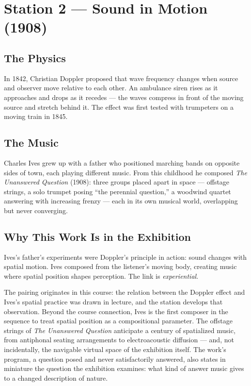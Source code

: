 \documentclass[11pt]{article}
\begin{document}
\section{Station 2 --- Sound in Motion (1908)}

\subsection{The Physics}
In 1842, Christian Doppler proposed that wave frequency changes when source and observer move
relative to each other. An ambulance siren rises as it approaches and drops as it recedes ---
the waves compress in front of the moving source and stretch behind it. The effect was first
tested with trumpeters on a moving train in 1845.

\subsection{The Music}
Charles Ives grew up with a father who positioned marching bands on opposite sides of town,
each playing different music. From this childhood he composed \emph{The Unanswered Question}
(1908): three groups placed apart in space --- offstage strings, a solo trumpet posing ``the
perennial question,'' a woodwind quartet answering with increasing frenzy --- each in its own
musical world, overlapping but never converging.

\subsection{Why This Work Is in the Exhibition}
Ives's father's experiments were Doppler's principle in action: sound changes with spatial
motion. Ives composed from the listener's moving body, creating music where spatial position
shapes perception. The link is \emph{experiential}.

The pairing originates in this course: the relation between the Doppler effect and Ives's
spatial practice was drawn in lecture, and the station develops that observation. Beyond the
course connection, Ives is the first composer in the sequence to treat spatial position as a
compositional parameter. The offstage strings of \emph{The Unanswered Question} anticipate a
century of spatialized music, from antiphonal seating arrangements to electroacoustic
diffusion --- and, not incidentally, the navigable virtual space of the exhibition itself.
The work's program, a question posed and never satisfactorily answered, also states in
miniature the question the exhibition examines: what kind of answer music gives to a changed
description of nature.
\end{document}
